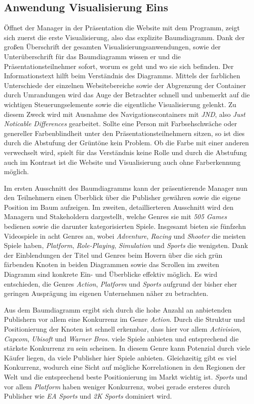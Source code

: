 \documentclass[usegeometry=true]{scrartcl}
\begin{document}
\subsection{Anwendung Visualisierung Eins}
Öffnet der Manager in der Präsentation die Website mit dem Programm, zeigt sich zuerst die erste Visualisierung, also das explizite Baumdiagramm. 
Dank der großen Überschrift der gesamten Visualisierungsanwendungen, sowie der Unterüberschrift für das Baumdiagramm wissen er und die Präsentationsteilnehmer sofort, worum es geht und wo sie sich befinden.
Der Informationstext hilft beim Verständnis des Diagramms.
Mittels der farblichen Unterschiede der einzelnen Websitebereiche sowie der Abgrenzung der Container durch Umrandungen wird das Auge der Betrachter schnell und unbemerkt auf die wichtigen Steuerungselemente sowie die eigentliche Visualisierung gelenkt.
Zu diesem Zweck wird mit Ausnahme des Navigationscontainers mit \textit{JND}, also \textit{Just Noticable Differences} gearbeitet.
Sollte eine Person mit Farbsehschwäche oder genereller Farbenblindheit unter den Präsentationsteilnehmern sitzen, so ist dies durch die Abstufung der Grüntöne kein Problem. 
Ob die Farbe mit einer anderen verwechselt wird, spielt für das Verständnis keine Rolle und durch die Abstufung auch im Kontrast ist die Website und Visualisierung auch ohne Farberkennung möglich.

Im ersten Ausschnitt des Baumdiagramms kann der präsentierende Manager nun den Teilnehmern einen Überblick über die Publisher gewähren sowie die eigene Position im Baum aufzeigen.
Im zweiten, detaillierteren Ausschnitt wird den Managern und Stakeholdern dargestellt, welche Genres sie mit \textit{505 Games} bedienen sowie die darunter kategorisierten Spiele.
Insgesamt bieten sie fünfzehn Videospiele in acht Genres an, wobei \textit{Adventure}, \textit{Racing} und \textit{Shooter} die meisten Spiele haben, \textit{Platform}, \textit{Role-Playing}, \textit{Simulation} und \textit{Sports} die wenigsten.
Dank der Einblendungen der Titel und Genres beim Hovern über die sich grün färbenden Knoten in beiden Diagrammen sowie das Scrollen im zweiten Diagramm sind konkrete Ein- und Überblicke effektiv möglich. 
Es wird entschieden, die Genres \textit{Action}, \textit{Platform} und \textit{Sports} aufgrund der bisher eher geringen Ausprägung im eigenen Unternehmen näher zu betrachten. 

Aus dem Baumdiagramm ergibt sich durch die hohe Anzahl an anbietenden Publishern vor allem eine Konkurrenz im Genre \textit{Action}. 
Durch die Struktur und Positionierung der Knoten ist schnell erkennbar, dass hier vor allem \textit{Activision}, \textit{Capcom}, \textit{Ubisoft} und \textit{Warner Bros.} viele Spiele anbieten und entsprechend die stärkste Konkurrenz zu sein scheinen. 
In diesem Genre kann Potenzial durch viele Käufer liegen, da viele Publisher hier Spiele anbieten. 
Gleichzeitig gibt es viel Konkurrenz, wodurch eine Sicht auf mögliche Korrelationen in den Regionen der Welt und die entsprechend beste Positionierung im Markt wichtig ist.
\textit{Sports} und vor allem \textit{Platform} haben weniger Konkurrenz, wobei gerade ersteres durch Publisher wie \textit{EA Sports} und \textit{2K Sports} dominiert wird.
\end{document}
